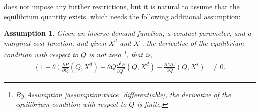 \documentclass[11pt, a4paper]{article}
\newtheorem{assumption}{Assumption}
\theoremstyle{remark}
\begin{document}
\citet{lau1982identifying} does not impose any further restrictions, but it is natural to assume that the equilibrium quantity exists, which needs the following additional assumption:
\begin{assumption}\label{assumption:unique_equilibrium}
    Given an inverse demand function, a conduct parameter, and a marginal cost function, and given $X^{d}$ and $X^{s}$, the derivative of the equilibrium condition with respect to $Q$ is not zero \footnote{By Assumption \ref{assumption:twice_differentiable}, the derivative of the equilibrium condition with respect to $Q$ is finite.}, that is,
    \begin{align}
        (1+\theta)\frac{\partial P}{\partial Q}(Q, X^{d}) + \theta Q\frac{\partial^2 P}{\partial Q^2}(Q, X^{d}) - \frac{\partial MC}{\partial Q}(Q, X^{s}) & \ne 0.
    \end{align}
\end{assumption}


\end{document}
